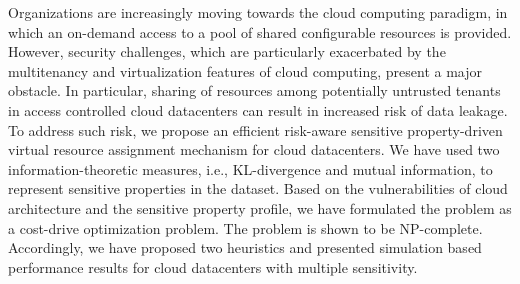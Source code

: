 Organizations are increasingly moving towards the cloud computing paradigm, in which an on-demand access to a pool of shared configurable resources is provided. However, security challenges, which are particularly exacerbated by the multitenancy and virtualization features of cloud computing, present a major obstacle. In particular, sharing of resources among potentially untrusted tenants in access controlled cloud datacenters can result in increased risk of data leakage. To address such risk, we propose an efficient risk-aware sensitive property-driven virtual resource assignment mechanism for cloud datacenters. We have used two information-theoretic measures, i.e., KL-divergence and mutual information, to represent sensitive properties in the dataset. Based on the vulnerabilities of cloud architecture and the sensitive property profile, we have formulated the problem as a cost-drive optimization problem. The problem is shown to be NP-complete. Accordingly, we have proposed two heuristics and presented simulation based performance results for cloud datacenters with multiple sensitivity.